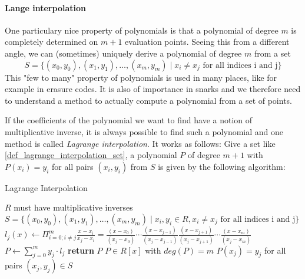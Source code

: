 \paragraph{Lange interpolation}
One particulary nice property of polynomials is that a polynomial of degree $m$ is completely determined on $m+1$ evaluation points. Seeing this from a different angle, we can (sometimes) uniquely derive a polynomial of degree $m$ from a set 
\begin{equation}
\label{def_lagrange_interpolation_set}
S= \{(x_0,y_0), (x_1,y_1),\ldots,(x_m,y_m)\;|\; x_i\neq x_j\text{ for all indices i and j}\}
\end{equation}
This "few to many" property of polynomials is used in many places, like for example in erasure codes. It is also of importance in snarks and we therefore need to understand a method to actually compute a polynomial from a set of points. 

If the coefficients of the polynomial we want to find have a notion of multiplicative inverse, it is always possible to find such a polynomial and one method is called \textit{Lagrange interpolation}. It works as follows:
Give a set like \ref{def_lagrange_interpolation_set}, a polynomial $P$ of degree $m+1$ with $P(x_i)=y_i$ for all pairs $(x_i,y_i)$ from $S$ is given by the following algorithm:

\begin{algorithm}\caption{Lagrange Interpolation}
\label{alg_lagrange_interplation}
\begin{algorithmic}[0]
\Require $R$ must have multiplicative inverses
\Require $S= \{(x_0,y_0), (x_1,y_1),\ldots,(x_m,y_m)\;|\; x_i,y_i\in R, x_i\neq x_j\text{ for all indices i and j}\}$  
\State  $l_j(x) \gets \Pi_{i=0;i\neq j}^{m}\frac{x-x_i}{x_j-x_i} = \frac{(x-x_0)}{(x_j-x_0)} \cdots \frac{(x-x_{j-1})}{(x_j-x_{j - 1})} \frac{(x-x_{j+1})}{(x_j-x_{j+1})} \cdots \frac{(x-x_m)}{(x_j-x_m)}$
\EndFor
\State $P\gets \sum_{j=0}^m y_j\cdot l_j$
\State \textbf{return} $P$ 
\EndProcedure
\Ensure $P\in R[x]$ with $deg(P)=m$
\Ensure $P(x_j)=y_j$ for all pairs $(x_j,y_j)\in S$
\end{algorithmic}
\end{algorithm}

